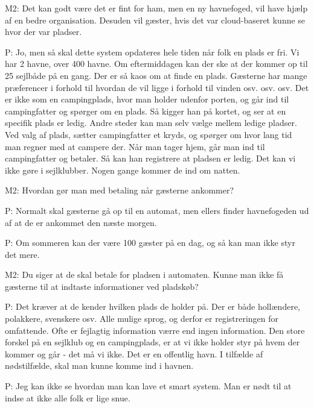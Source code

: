 \documentclass{article}
\begin{document}
M2: Det kan godt være det er fint for ham, men en ny havnefoged, vil have hjælp af en bedre organisation. Desuden vil gæster, hvis det var cloud-baseret kunne se hvor der var pladser.

P: Jo, men så skal dette system opdateres hele tiden når folk en plads er fri. Vi har 2 havne, over 400 havne. Om eftermiddagen kan der ske at der kommer op til 25 sejlbåde på en gang. Der er så kaos om at finde en plads. Gæsterne har mange præferencer i forhold til hvordan de vil ligge i forhold til vinden osv. osv. osv. Det er ikke som en campingplads, hvor man holder udenfor porten, og går ind til campingfatter og spørger om en plads. Så kigger han på kortet, og ser at en specifik plads er ledig. Andre steder kan man selv vælge mellem ledige pladser. Ved valg af plads, sætter campingfatter et kryds, og spørger om hvor lang tid man regner med at campere der. Når man tager hjem, går man ind til campingfatter og betaler. Så kan han registrere at pladsen er ledig. Det kan vi ikke gøre i sejlklubber. Nogen gange kommer de ind om natten.

M2: Hvordan gør man med betaling når gæsterne ankommer?

P: Normalt skal gæsterne gå op til en automat, men ellers finder havnefogeden ud af at de er ankommet den næste morgen.

P: Om sommeren kan der være 100 gæster på en dag, og så kan man ikke styr det mere.

M2: Du siger at de skal betale for pladsen i automaten. Kunne man ikke få gæsterne til at indtaste informationer ved pladskøb? 

P: Det kræver at de kender hvilken plads de holder på. Der er både hollændere, polakkere, svenskere osv. Alle mulige sprog, og derfor er registreringen for omfattende. Ofte er fejlagtig information værre end ingen information. Den store forskel på en sejlklub og en campingplads, er at vi ikke holder styr på hvem der kommer og går - det må vi ikke. Det er en offentlig havn. I tilfælde af nødstilfælde, skal man kunne komme ind i havnen.

P: Jeg kan ikke se hvordan man kan lave et smart system. Man er nødt til at indse at ikke alle folk er lige snue. 
\end{document}
